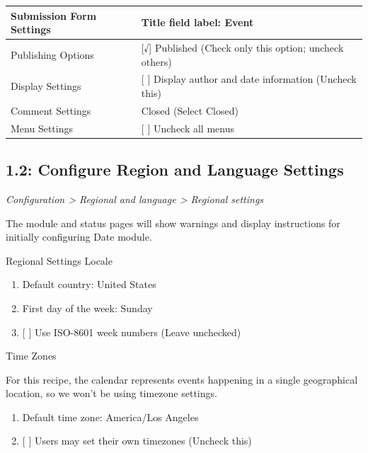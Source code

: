 \documentclass[letterpaper,10pt,english]{sphinxmanual}
\begin{document}
\begin{tabulary}{\linewidth}{|L|L|}
\hline

Submission Form Settings
 & 
Title field label: Event
\\\hline

Publishing Options
 & 
{[}√{]} Published (Check only this option; uncheck others)
\\\hline

Display Settings
 & 
{[} {]} Display author and date information (Uncheck this)
\\\hline

Comment Settings
 & 
Closed (Select Closed)
\\\hline

Menu Settings
 & 
{[} {]} Uncheck all menus
\\\hline
\end{tabulary}



\subsection{1.2: Configure Region and Language Settings}
\label{event_calendar:configure-region-and-language-settings}
\emph{Configuration \textgreater{} Regional and language \textgreater{} Regional settings}

The module and status pages will show warnings and display instructions for initially configuring Date module.

Regional Settings
Locale
\begin{enumerate}
\item {} 
Default country: United States

\item {} 
First day of the week: Sunday

\item {} 
{[} {]} Use ISO-8601 week numbers  (Leave unchecked)

\end{enumerate}

Time Zones

For this recipe, the calendar represents events happening in a single geographical location, so we won't be using timezone settings.
\begin{enumerate}
\item {} 
Default time zone: America/Los Angeles

\item {} 
{[} {]} Users may set their own timezones (Uncheck this)

\end{enumerate}
\end{document}
